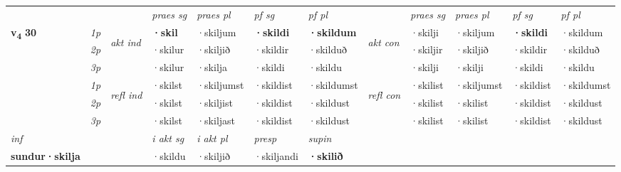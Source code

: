 \begin{longtable}[l]{X>{\footnotesize\itshape}llXXXXlXXXX}
 & &   & \textit{praes sg}  & \textit{praes pl}    & \textit{ pf sg} & \textit{pf pl} & & \textit{praes sg}  & \textit{praes pl}    & \textit{pf sg} & \textit{pf pl }  \\ \cmidrule{4-7} \cmidrule{9-12}
 \multirow{2}{*}{{{\textbf{v{\textsubscript{4}}} \Large{\textbf{30}}}}}  & 1p & \multirow{3}{*}{\begin{turn}{90}\textit{akt ind}\end{turn}} & \textbf{·skil} & ·skiljum & \textbf{·skildi} & \textbf{·skildum} & \multirow{3}{*}{\begin{turn}{90}\textit{akt con}\end{turn}} &·skilji & ·skiljum & \textbf{·skildi} & ·skildum\\*
 & 2p &  &  ·skilur  & ·skiljið & ·skildir & ·skilduð & & ·skiljir & ·skiljið & ·skildir & ·skilduð \\*
 & 3p &  & ·skilur & ·skilja & ·skildi & ·skildu & & ·skilji & ·skilji& ·skildi & ·skildu \\*
\cmidrule{4-7} \cmidrule{9-12}
 & 1p & \multirow{3}{*}{\begin{turn}{90}\textit{refl ind}\end{turn}}  & ·skilst & ·skiljumst & ·skildist & ·skildumst & \multirow{3}{*}{\begin{turn}{90}\textit{refl con}\end{turn}}  &·skilist & ·skiljumst & ·skildist & ·skildumst \\*
 & 2p &  & ·skilst & ·skiljist & ·skildist & ·skildust & &·skilist & ·skilist & ·skildist & ·skildust \\*
 & 3p  & & ·skilst & ·skiljast & ·skildist & ·skildust & & ·skilist & ·skilist& ·skildist & ·skildust \\*
\cmidrule{4-7} \cmidrule{9-12}

   {\textit{inf}} & &  & \textit{i akt sg} & \textit{i akt pl}   & \textit{presp} & \textit{supin}   \\*
  {\textbf{sundur\allowbreak ·skilja}} & && ·skildu  & ·skiljið   & ·skiljandi &  \textbf{·skilið}   \\*

\midrule


\end{longtable}
